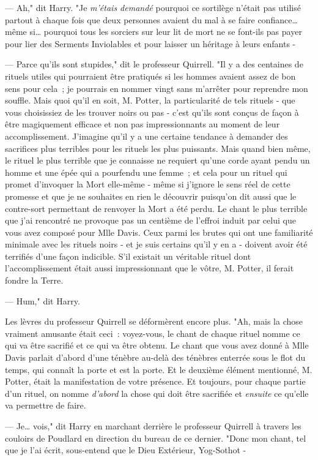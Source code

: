 --- Ah," dit Harry. "Je \emph{m'étais demandé} pourquoi ce sortilège n'était pas utilisé partout à chaque fois que deux personnes avaient du mal à se faire confiance… même si… pourquoi tous les sorciers sur leur lit de mort ne se font-ils pas payer pour lier des Serments Inviolables et pour laisser un héritage à leurs enfants -

--- Parce qu'ils sont stupides," dit le professeur Quirrell. "Il y a des centaines de rituels utiles qui pourraient être pratiqués si les hommes avaient assez de bon sens pour cela~; je pourrais en nommer vingt sans m'arrêter pour reprendre mon souffle. Mais quoi qu'il en soit, M. Potter, la particularité de tels rituels - que vous choisissiez de les trouver noirs ou pas - c'est qu'ils sont conçus de façon à être magiquement efficace et non pas impressionnants au moment de leur accomplissement. J'imagine qu'il y a une certaine tendance à demander des sacrifices plus terribles pour les rituels les plus puissants. Mais quand bien même, le rituel le plus terrible que je connaisse ne requiert qu'une corde ayant pendu un homme et une épée qui a pourfendu une femme~; et cela pour un rituel qui promet d'invoquer la Mort elle-même - même si j'ignore le sens réel de cette promesse et que je ne souhaites en rien le découvrir puisqu'on dit aussi que le contre-sort permettant de renvoyer la Mort a été perdu. Le chant le plus terrible que j'ai rencontré ne provoque pas un centième de l'effroi induit par celui que vous avez composé pour Mlle Davis. Ceux parmi les brutes qui ont une familiarité minimale avec les rituels noirs - et je suis certains qu'il y en a - doivent avoir été terrifiés d'une façon indicible. S'il existait un véritable rituel dont l'accomplissement était aussi impressionnant que le vôtre, M. Potter, il ferait fondre la Terre.

--- Hum," dit Harry.

Les lèvres du professeur Quirrell se déformèrent encore plus. "Ah, mais la chose vraiment amusante était ceci~: voyez-vous, le chant de chaque rituel nomme ce qui va être sacrifié et ce qui va être obtenu. Le chant que vous avez donné à Mlle Davis parlait d'abord d'une ténèbre au-delà des ténèbres enterrée sous le flot du temps, qui connaît la porte et est la porte. Et le deuxième élément mentionné, M. Potter, était la manifestation de votre présence. Et toujours, pour chaque partie d'un rituel, on nomme \emph{d'abord} la chose qui doit être sacrifiée et \emph{ensuite} ce qu'elle va permettre de faire.

--- Je… vois," dit Harry en marchant derrière le professeur Quirrell à travers les couloirs de Poudlard en direction du bureau de ce dernier. "Donc mon chant, tel que je l'ai écrit, sous-entend que le Dieu Extérieur, Yog-Sothot -

